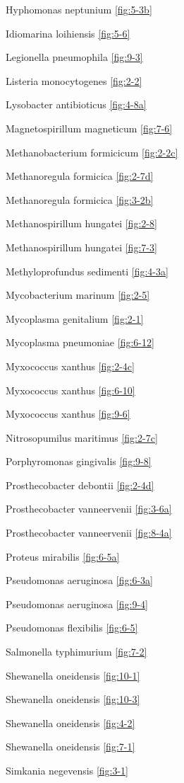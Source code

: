 \documentclass[]{tufte-book}
\begin{document}
Hyphomonas neptunium \ref{fig:5-3b}

Idiomarina loihiensis \ref{fig:5-6}

Legionella pneumophila \ref{fig:9-3}

Listeria monocytogenes \ref{fig:2-2}

Lysobacter antibioticus \ref{fig:4-8a}

Magnetospirillum magneticum \ref{fig:7-6}

Methanobacterium formicicum \ref{fig:2-2c}

Methanoregula formicica \ref{fig:2-7d}

Methanoregula formicica \ref{fig:3-2b}

Methanospirillum hungatei \ref{fig:2-8}

Methanospirillum hungatei \ref{fig:7-3}

Methyloprofundus sedimenti \ref{fig:4-3a}

Mycobacterium marinum \ref{fig:2-5}

Mycoplasma genitalium \ref{fig:2-1}

Mycoplasma pneumoniae \ref{fig:6-12}

Myxococcus xanthus \ref{fig:2-4c}

Myxococcus xanthus \ref{fig:6-10}

Myxococcus xanthus \ref{fig:9-6}

Nitrosopumilus maritimus \ref{fig:2-7c}

Porphyromonas gingivalis \ref{fig:9-8}

Prosthecobacter debontii \ref{fig:2-4d}

Prosthecobacter vanneervenii \ref{fig:3-6a}

Prosthecobacter vanneervenii \ref{fig:8-4a}

Proteus mirabilis \ref{fig:6-5a}

Pseudomonas aeruginosa \ref{fig:6-3a}

Pseudomonas aeruginosa \ref{fig:9-4}

Pseudomonas flexibilis \ref{fig:6-5}

Salmonella typhimurium \ref{fig:7-2}

Shewanella oneidensis \ref{fig:10-1}

Shewanella oneidensis \ref{fig:10-3}

Shewanella oneidensis \ref{fig:4-2}

Shewanella oneidensis \ref{fig:7-1}

Simkania negevensis \ref{fig:3-1}
\end{document}
